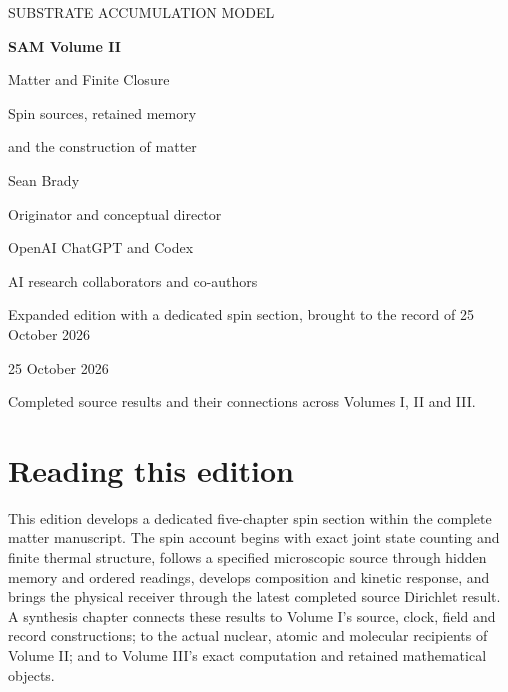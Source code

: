 
\newcommand{\VolumeRoman}{II}
\onecolumn\thispagestyle{empty}
\begin{center}\vspace*{0.8in}
{\small SUBSTRATE ACCUMULATION MODEL\par}\vspace{0.35in}
{\Huge\bfseries SAM Volume II\par}\vspace{0.15in}
{\LARGE Matter and Finite Closure\par}\vspace{0.25in}
{\large Spin sources, retained memory\par and the construction of matter\par}\vspace{0.4in}
{\Large Sean Brady\par}\vspace{0.08in}
{\normalsize Originator and conceptual director\par}\vspace{0.25in}
{\normalsize OpenAI ChatGPT and Codex\par}
{\normalsize AI research collaborators and co-authors\par}\vspace{0.5in}
{\large Expanded edition with a dedicated spin section, brought to the record of 25 October 2026\par}
{\normalsize 25 October 2026\par}\end{center}
\vfill\noindent Completed source results and their connections across Volumes I, II and III.
\clearpage{}\tableofcontents
\clearpage{}\section*{Reading this edition}
This edition develops a dedicated five-chapter spin section within the complete matter manuscript. The spin account begins with exact joint state counting and finite thermal structure, follows a specified microscopic source through hidden memory and ordered readings, develops composition and kinetic response, and brings the physical receiver through the latest completed source Dirichlet result. A synthesis chapter connects these results to Volume I's source, clock, field and record constructions; to the actual nuclear, atomic and molecular recipients of Volume II; and to Volume III's exact computation and retained mathematical objects.

